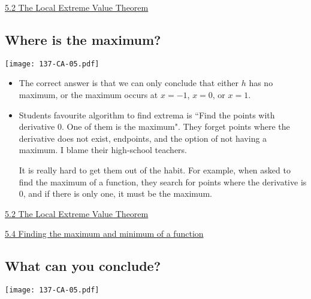 \documentclass[11pt]{article}
\newcommand{\nl}{\hfill \vspace{-1.1\baselineskip}} %
\newcommand{\vii}{\hspace{8mm} \href{https://www.youtube.com/watch?v=_z8OglXFIq8&list=PLlwePzQY_wW9m5oabUf6hvfVfAaA9uAwM&index=2}{5.2 The Local Extreme Value Theorem}}
\newcommand{\viv}{\hspace{8mm} \href{https://www.youtube.com/watch?v=_giwkVIFeGY&list=PLlwePzQY_wW9m5oabUf6hvfVfAaA9uAwM&index=4}{5.4 Finding the maximum and minimum of a function}}
\begin{document}
\begin{videos}
\vii
\end{videos}

\newpage
\subsection{Where is the maximum?}

\begin{center}
{ \texttt{[image: 137-CA-05.pdf]}} 
\end{center}


\begin{comments}
\nl
\begin{itemize}
	\item The correct answer is that we can only conclude that either $h$ has no maximum, or the maximum occurs at $x=-1$, $x=0$, or $x=1$.
	\item Students favourite algorithm to find extrema is ``Find the points with derivative 0.  One of them is the maximum". They forget points where the derivative does not exist, endpoints, and the option of not having a maximum.  I blame their high-school teachers.
	
	  It is really hard to get them out of the habit.  For example, when asked to find the maximum of a function, they search for points where the derivative is 0, and if there is only one, it must be the maximum.
\end{itemize}	
\end{comments}

\begin{videos}
\vii

\viv
\end{videos}

\newpage
\subsection{What can you conclude?}

\begin{center}
{ \texttt{[image: 137-CA-05.pdf]}} 
\end{center}
\end{document}
